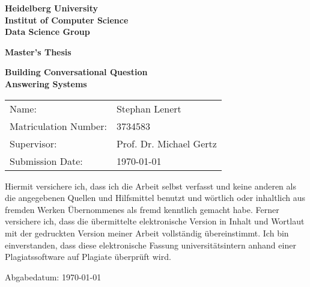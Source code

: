 \documentclass[
     12pt,         %
     a4paper,      %
     BCOR10mm,     %
     DIV14,        %
     ]{scrreprt}
\begin{document}
\begin{titlepage}


\vspace*{1cm}
\begin{center}
\vspace*{3cm}
\textbf{ 
\Large Heidelberg University\\
\smallskip
\Large Institut of Computer Science\\
\smallskip
\Large Data Science Group\\
\smallskip
}

\vspace{3cm}

\textbf{\large Master's Thesis} %

\vspace{0.5\baselineskip}
{\huge
\textbf{Building Conversational Question} \vspace{0.2cm}\\
\textbf{Answering Systems}
}
\end{center}

\vfill 

{\large
\begin{tabular}[l]{ll}
Name: & Stephan Lenert\\
Matriculation Number: & 3734583\\
Supervisor: & Prof. Dr. Michael Gertz\\
Submission Date: & \today
\end{tabular}
}

\end{titlepage}

\onehalfspacing

\thispagestyle{empty}

\vspace*{100pt}
\noindent
Hiermit versichere ich, dass ich die Arbeit selbst verfasst und keine anderen als die angegebenen Quellen und Hilfsmittel benutzt und wörtlich oder inhaltlich aus fremden Werken Übernommenes als fremd kenntlich gemacht habe. Ferner versichere ich, dass die übermittelte elektronische Version in Inhalt und Wortlaut mit der gedruckten Version meiner Arbeit vollständig übereinstimmt. Ich bin einverstanden, dass diese elektronische Fassung universitätsintern anhand einer Plagiatssoftware auf Plagiate überprüft wird.
\vspace*{50pt}
\noindent

\underline{\phantom{mmmmmmmmmmmmmmmmmmmm}}

\medskip
\noindent 
Abgabedatum: \today
\newpage
\end{document}
